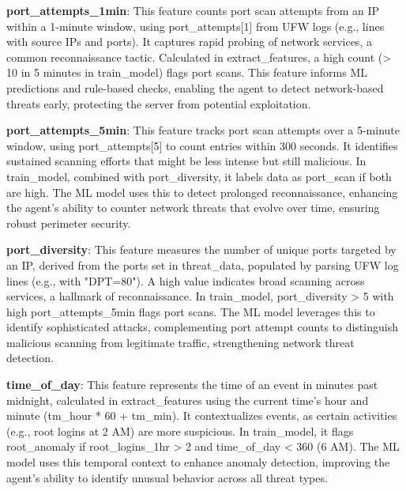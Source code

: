 \textbf{port\_attempts\_1min}: This feature counts port scan attempts from an IP within a 1-minute window, using port\_attempts[1] from UFW logs (e.g., lines with source IPs and ports). It captures rapid probing of network services, a common reconnaissance tactic. Calculated in extract\_features, a high count (> 10 in 5 minutes in train\_model) flags port scans. This feature informs ML predictions and rule-based checks, enabling the agent to detect network-based threats early, protecting the server from potential exploitation.

\textbf{port\_attempts\_5min}: This feature tracks port scan attempts over a 5-minute window, using port\_attempts[5] to count entries within 300 seconds. It identifies sustained scanning efforts that might be less intense but still malicious. In train\_model, combined with port\_diversity, it labels data as port\_scan if both are high. The ML model uses this to detect prolonged reconnaissance, enhancing the agent’s ability to counter network threats that evolve over time, ensuring robust perimeter security.

\textbf{port\_diversity}: This feature measures the number of unique ports targeted by an IP, derived from the ports set in threat\_data, populated by parsing UFW log lines (e.g., with "DPT=80"). A high value indicates broad scanning across services, a hallmark of reconnaissance. In train\_model, port\_diversity > 5 with high port\_attempts\_5min flags port scans. The ML model leverages this to identify sophisticated attacks, complementing port attempt counts to distinguish malicious scanning from legitimate traffic, strengthening network threat detection.

\textbf{time\_of\_day}: This feature represents the time of an event in minutes past midnight, calculated in extract\_features using the current time’s hour and minute (tm\_hour * 60 + tm\_min). It contextualizes events, as certain activities (e.g., root logins at 2 AM) are more suspicious. In train\_model, it flags root\_anomaly if root\_logins\_1hr > 2 and time\_of\_day < 360 (6 AM). The ML model uses this temporal context to enhance anomaly detection, improving the agent’s ability to identify unusual behavior across all threat types.









